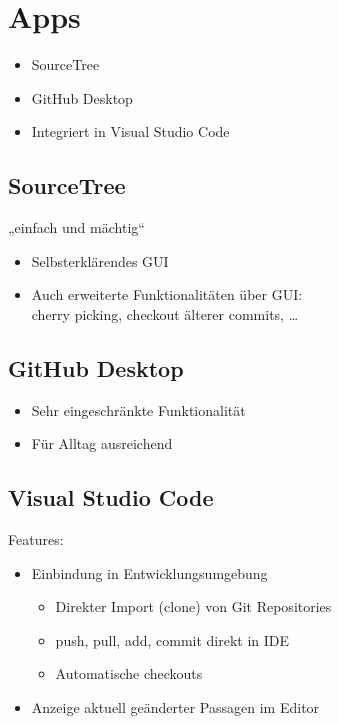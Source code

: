 \section{Apps}
\begin{frame}
\begin{itemize}
	\item SourceTree
	\item GitHub Desktop
	\item Integriert in Visual Studio Code
\end{itemize}
\end{frame}

\subsection{SourceTree}
\begin{frame}{„einfach und mächtig“}
\begin{itemize}
\item Selbsterklärendes GUI
\item Auch erweiterte Funktionalitäten über GUI:\\
cherry picking, checkout älterer commits, …
\end{itemize}
\end{frame}

\subsection{GitHub Desktop}
\begin{frame}
\begin{itemize}
\item Sehr eingeschränkte Funktionalität
\item Für Alltag ausreichend
\end{itemize}
\end{frame}

\subsection{Visual Studio Code}
\begin{frame}
Features:
\begin{itemize}
	\item <2->Einbindung in Entwicklungsumgebung
	\begin{itemize}
		\item <3->Direkter Import (clone) von Git Repositories
		\item <4->push, pull, add, commit direkt in IDE
		\item <5->Automatische checkouts
	\end{itemize}
	\item <6->Anzeige aktuell geänderter Passagen im Editor
\end{itemize}
\end{frame}